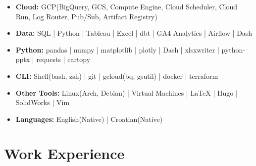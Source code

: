 \documentclass[a4paper, 9pt]{article}
\begin{document}
\begin{itemize}[itemsep=0.0em]
    \item[] \faCloud \hspace{1mm} \textbf{Cloud:} \hspace{8.7mm} GCP(BigQuery, GCS, Compute Engine, Cloud Scheduler, Cloud Run, Log Router, Pub/Sub, Artifact Registry)
    \item[] \faBarChart \hspace{1mm} \textbf{Data:} \hspace{10.5mm}  SQL | Python | Tableau | Excel | dbt | GA4 Analytics | Airflow | Dash
    \item[] \faCog \hspace{1mm} \textbf{Python:} \hspace{7.6mm} pandas | numpy | matplotlib | plotly | Dash | xlsxwriter | python-pptx | requests | cartopy
    \item[] \faTerminal \hspace{1mm} \textbf{CLI:} \hspace{13.6mm} Shell(bash, zsh) | git |  gcloud(bq, gsutil) | docker | terraform
    \item[] \faWrench \hspace{1mm} \textbf{Other Tools:} \hspace{0.0mm}  Linux(Arch, Debian) | Virtual Machines |  LaTeX  | Hugo | SolidWorks | Vim
    \item[] \faLanguage \hspace{1mm} \textbf{Languages:} \hspace{1.5mm} English(Native) |  Croatian(Native)
\end{itemize}

\section*{Work Experience}
\end{document}
